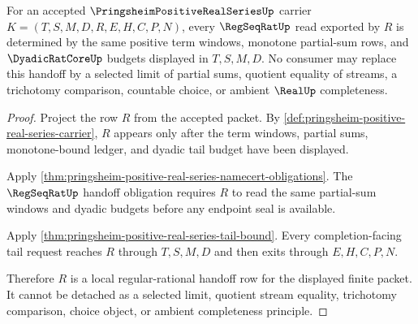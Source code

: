 \begin{theorem}
\label{thm:pringsheim-positive-real-series-regseqrat-handoff}
For an accepted $\PringsheimPositiveRealSeriesUp$ carrier $K=(T,S,M,D,R,E,H,C,P,N)$, every $\RegSeqRatUp$ read exported by $R$ is determined by the same positive term windows, monotone partial-sum rows, and $\DyadicRatCoreUp$ budgets displayed in $T,S,M,D$. No consumer may replace this handoff by a selected limit of partial sums, quotient equality of streams, a trichotomy comparison, countable choice, or ambient $\RealUp$ completeness.
\end{theorem}
\begin{proof}
Project the row $R$ from the accepted packet. By \autoref{def:pringsheim-positive-real-series-carrier}, $R$ appears only after the term windows, partial sums, monotone-bound ledger, and dyadic tail budget have been displayed.

Apply \autoref{thm:pringsheim-positive-real-series-namecert-obligations}. The $\RegSeqRatUp$ handoff obligation requires $R$ to read the same partial-sum windows and dyadic budgets before any endpoint seal is available.

Apply \autoref{thm:pringsheim-positive-real-series-tail-bound}. Every completion-facing tail request reaches $R$ through $T,S,M,D$ and then exits through $E,H,C,P,N$.

Therefore $R$ is a local regular-rational handoff row for the displayed finite packet. It cannot be detached as a selected limit, quotient stream equality, trichotomy comparison, choice object, or ambient completeness principle.
\end{proof}

